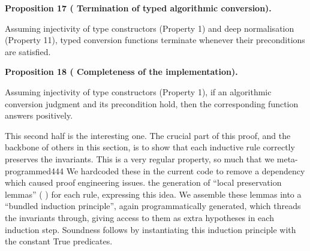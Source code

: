 \documentclass[10pt,a4paper]{amsart}
\begin{document}
 

 
\par\medskip\noindent\textbf{Proposition 17 (  Termination of typed algorithmic conversion).}\par
 
 
Assuming injectivity of type constructors (Property 1) and deep normalisation (Property 11), typed conversion functions terminate whenever their preconditions are satisfied.\par
 
 

 
\par\medskip\noindent\textbf{Proposition 18 (  Completeness of the implementation).}\par
 
 
Assuming injectivity of type constructors (Property 1), if an algorithmic conversion judgment and its precondition hold, then the corresponding function answers positively.\par
 
 

 
This second half is the interesting one. The crucial part of this proof, and the backbone of others in this section, is to show that each inductive rule correctly preserves the invariants. This is a very regular property, so much that we meta-programmed444 We hardcoded these in the current code to remove a dependency which caused proof engineering issues.  the generation of “local preservation lemmas” ( ) for each rule, expressing this idea. We assemble these lemmas into a “bundled induction principle”, again programmatically generated, which threads the invariants through, giving access to them as extra hypotheses in each induction step. Soundness follows by instantiating this induction principle with the constant True predicates.\par
 
 
 
\end{document}
